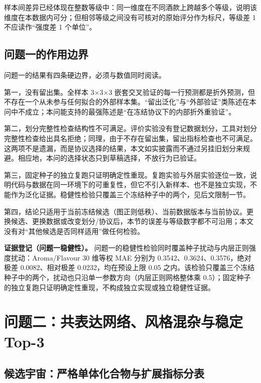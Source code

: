 \documentclass[11pt,a4paper]{article}
\begin{document}
样本间差异已经体现在整数等级中：同一维度在不同酒款上跨越多个等级，说明该维度在本数据内可分；但相邻等级之间没有可核对的原始评分作为标尺，等级差
1 不应读作``强度差 1 个单位''。

\subsection{问题一的作用边界}\label{ux95eeux9898ux4e00ux7684ux4f5cux7528ux8fb9ux754c}

问题一的结果有四条硬边界，必须与数值同时阅读。

第一，没有留出集。全样本 3×3×3
嵌套交叉验证的每一行预测都是折外预测，但不存在一个从未参与任何拟合的外部样本集。``留出泛化''与``外部验证''类陈述在本问中不成立；本问能支持的最强陈述是``在冻结协议下的内部折外重验证''。

第二，划分完整性检查结构性不可满足。评价实验没有登记数据划分，工具对划分完整性检查给出具名拒绝；同理，由于不存在留出集，留出指标检查也不可满足。这两项不是遗漏，而是协议选择的结果，本文如实披露而不通过另挂旧划分来规避。相应地，本问的选择状态只到草稿选择，不放行为已验证。

第三，固定种子的独立复跑只证明确定性重现。复跑实验与外层实验逐位一致，说明代码与数据在同一环境下的可重复性，但它不引入新样本、也不是独立实现，不能作为泛化证据。稳健性检验只覆盖三个冻结种子中的两个，见后文限制一节。

第四，结论只适用于当前冻结候选（图正则低秩）、当前数据版本与当前协议。更换候选、更换数据或改变划分/协议后，本节的误差与等级数字都不可沿用；本文没有对``其他候选是否同样适用''做任何检验。

\textbf{证据登记（问题一稳健性）。}
问题一的稳健性检验同时覆盖种子扰动与内层正则强度扰动：Aroma/Flavour 30
维等权 MAE 分别为 0.3542、0.3624、0.3576，绝对极差 0.0082、相对极差
0.0232，均在预设上限 0.05
之内。该检验只覆盖三个冻结种子中的两个，扰动也只沿单一参数方向（内层正则网格整体乘
0.5）；固定种子的独立复跑只证明确定性重现，不构成独立实现或独立稳健性证据。

\section{问题二：共表达网络、风格混杂与稳定
Top-3}\label{ux95eeux9898ux4e8cux5171ux8868ux8fbeux7f51ux7edcux98ceux683cux6df7ux6742ux4e0eux7a33ux5b9a-top-3}

\subsection{候选宇宙：严格单体化合物与扩展指标分表}\label{ux5019ux9009ux5b87ux5b99ux4e25ux683cux5355ux4f53ux5316ux5408ux7269ux4e0eux6269ux5c55ux6307ux6807ux5206ux8868}
\end{document}
